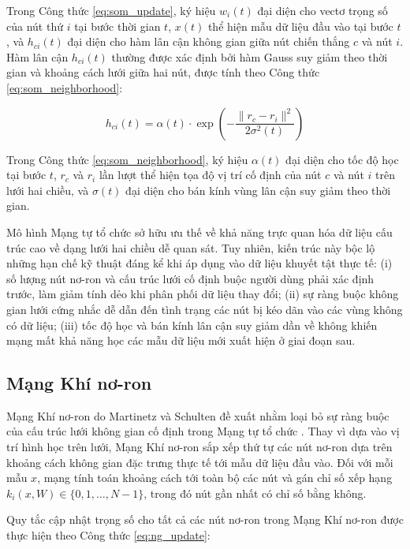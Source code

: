 Trong Công thức \ref{eq:som_update}, ký hiệu $w_i(t)$ đại diện cho vectơ trọng số của nút thứ $i$ tại bước thời gian $t$, $x(t)$ thể hiện mẫu dữ liệu đầu vào tại bước $t$, và $h_{ci}(t)$ đại diện cho hàm lân cận không gian giữa nút chiến thắng $c$ và nút $i$. Hàm lân cận $h_{ci}(t)$ thường được xác định bởi hàm Gauss suy giảm theo thời gian và khoảng cách lưới giữa hai nút, được tính theo Công thức \ref{eq:som_neighborhood}:

\begin{equation}
h_{ci}(t) = \alpha(t) \cdot \exp\left( -\frac{\|r_c - r_i\|^2}{2\sigma^2(t)} \right)
\label{eq:som_neighborhood}
\end{equation}

Trong Công thức \ref{eq:som_neighborhood}, ký hiệu $\alpha(t)$ đại diện cho tốc độ học tại bước $t$, $r_c$ và $r_i$ lần lượt thể hiện tọa độ vị trí cố định của nút $c$ và nút $i$ trên lưới hai chiều, và $\sigma(t)$ đại diện cho bán kính vùng lân cận suy giảm theo thời gian.

Mô hình Mạng tự tổ chức sở hữu ưu thế về khả năng trực quan hóa dữ liệu cấu trúc cao về dạng lưới hai chiều dễ quan sát. Tuy nhiên, kiến trúc này bộc lộ những hạn chế kỹ thuật đáng kể khi áp dụng vào dữ liệu khuyết tật thực tế:
(i) số lượng nút nơ-ron và cấu trúc lưới cố định buộc người dùng phải xác định trước, làm giảm tính dẻo khi phân phối dữ liệu thay đổi;
(ii) sự ràng buộc không gian lưới cứng nhắc dễ dẫn đến tình trạng các nút bị kéo dãn vào các vùng không có dữ liệu;
(iii) tốc độ học và bán kính lân cận suy giảm dần về không khiến mạng mất khả năng học các mẫu dữ liệu mới xuất hiện ở giai đoạn sau.

\subsection{Mạng Khí nơ-ron}

Mạng Khí nơ-ron do Martinetz và Schulten đề xuất nhằm loại bỏ sự ràng buộc của cấu trúc lưới không gian cố định trong Mạng tự tổ chức \cite{martinetz1991neural}. Thay vì dựa vào vị trí hình học trên lưới, Mạng Khí nơ-ron sắp xếp thứ tự các nút nơ-ron dựa trên khoảng cách không gian đặc trưng thực tế tới mẫu dữ liệu đầu vào. Đối với mỗi mẫu $x$, mạng tính toán khoảng cách tới toàn bộ các nút và gán chỉ số xếp hạng $k_i(x, W) \in \{0, 1, \dots, N-1\}$, trong đó nút gần nhất có chỉ số bằng không.

Quy tắc cập nhật trọng số cho tất cả các nút nơ-ron trong Mạng Khí nơ-ron được thực hiện theo Công thức \ref{eq:ng_update}:


